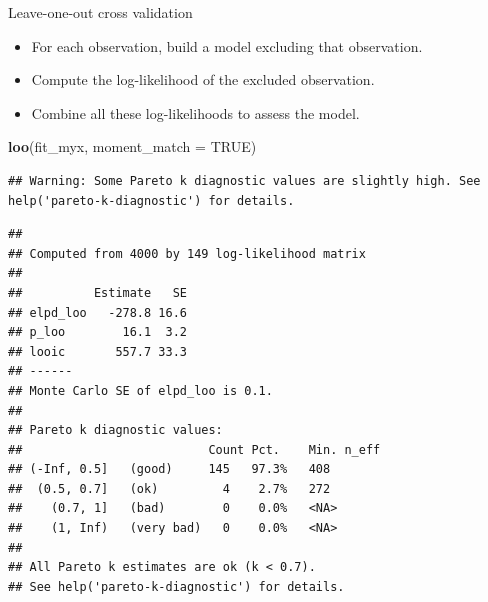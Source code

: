 \documentclass[
  ignorenonframetext,
]{beamer}
\newenvironment{Shaded}{\begin{snugshade}}{\end{snugshade}}
\newcommand{\DataTypeTok}[1]{\textcolor[rgb]{0.13,0.29,0.53}{#1}}
\newcommand{\KeywordTok}[1]{\textcolor[rgb]{0.13,0.29,0.53}{\textbf{#1}}}
\newcommand{\NormalTok}[1]{#1}
\newcommand{\OtherTok}[1]{\textcolor[rgb]{0.56,0.35,0.01}{#1}}
\providecommand{\tightlist}{%
  \setlength{\itemsep}{0pt}\setlength{\parskip}{0pt}}
\begin{document}
\begin{frame}[fragile]{Leave-one-out cross validation}
\protect\hypertarget{leave-one-out-cross-validation}{}

\begin{itemize}
\tightlist
\item
  For each observation, build a model excluding that observation.
\item
  Compute the log-likelihood of the excluded observation.
\item
  Combine all these log-likelihoods to assess the model.
\end{itemize}

\tiny

\begin{Shaded}
\begin{Highlighting}[]
\KeywordTok{loo}\NormalTok{(fit_myx, }\DataTypeTok{moment_match =} \OtherTok{TRUE}\NormalTok{)}
\end{Highlighting}
\end{Shaded}

\begin{verbatim}
## Warning: Some Pareto k diagnostic values are slightly high. See help('pareto-k-diagnostic') for details.
\end{verbatim}

\begin{verbatim}
## 
## Computed from 4000 by 149 log-likelihood matrix
## 
##          Estimate   SE
## elpd_loo   -278.8 16.6
## p_loo        16.1  3.2
## looic       557.7 33.3
## ------
## Monte Carlo SE of elpd_loo is 0.1.
## 
## Pareto k diagnostic values:
##                          Count Pct.    Min. n_eff
## (-Inf, 0.5]   (good)     145   97.3%   408       
##  (0.5, 0.7]   (ok)         4    2.7%   272       
##    (0.7, 1]   (bad)        0    0.0%   <NA>      
##    (1, Inf)   (very bad)   0    0.0%   <NA>      
## 
## All Pareto k estimates are ok (k < 0.7).
## See help('pareto-k-diagnostic') for details.
\end{verbatim}

\end{frame}
\end{document}
